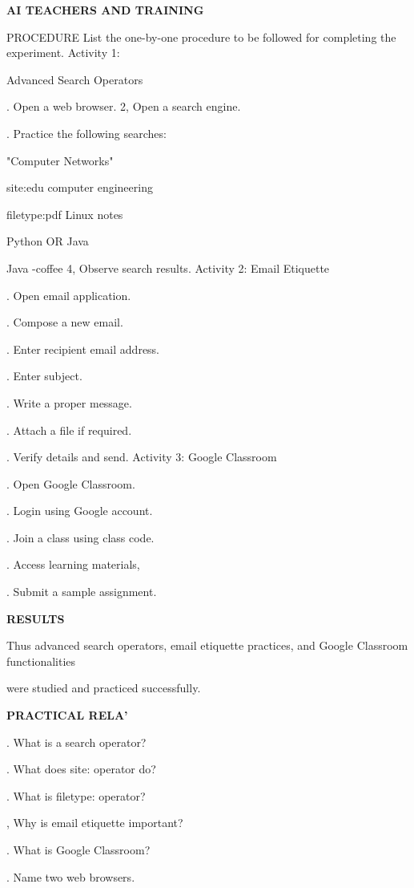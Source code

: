 \documentclass[10pt,a4paper]{article}
\begin{document}
\medskip\noindent\textbf{AI TEACHERS AND TRAINING}\par
\noindent PROCEDURE List the one-by-one procedure to be followed for completing the experiment. Activity 1:\par
\noindent Advanced Search Operators\par
{}. Open a web browser. 2, Open a search engine.\par
{}. Practice the following searches:\par
\noindent\textbullet\; "Computer Networks"\par
\noindent\textbullet\; site:edu computer engineering\par
\noindent\textbullet\; filetype:pdf Linux notes\par
\noindent\textbullet\; Python OR Java\par
\noindent\textbullet\; Java -coffee 4, Observe search results. Activity 2: Email Etiquette\par
{}. Open email application.\par
{}. Compose a new email.\par
{}. Enter recipient email address.\par
{}. Enter subject.\par
{}. Write a proper message.\par
{}. Attach a file if required.\par
{}. Verify details and send. Activity 3: Google Classroom\par
{}. Open Google Classroom.\par
{}. Login using Google account.\par
{}. Join a class using class code.\par
{}. Access learning materials,\par
{}. Submit a sample assignment.\par

\medskip\noindent\textbf{RESULTS}\par
\noindent Thus advanced search operators, email etiquette practices, and Google Classroom functionalities\par
\noindent were studied and practiced successfully.\par
\medskip\noindent\textbf{PRACTICAL RELA’}\par
{}. What is a search operator?\par
{}. What does site: operator do?\par
{}. What is filetype: operator?\par
{}, Why is email etiquette important?\par
{}. What is Google Classroom?\par
{}. Name two web browsers.\par
\end{document}
